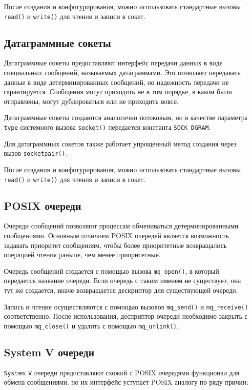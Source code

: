 \documentclass[14pt, russian]{scrartcl}
\begin{document}
После создания и конфигурирования, можно использовать стандартные вызовы
\verb|read()| и \verb|write()| для чтения и записи в сокет.

\subsection{Датаграммные сокеты}

Датаграммные сокеты предоставляют интерфейс передачи данных в виде специальных
сообщений, называемых датаграммами. Это позволяет передавать данные в виде
детерминированных сообщений, но надежность передачи не гарантируется. Сообщения
могут приходить не в том порядке, в каком были отправлены, могут дублироваться
или не приходить вовсе.

Датаграммные сокеты создаются аналогично потоковым, но в качестве параметра
\verb|type| системного вызова \verb|socket()| передается константа
\verb|SOCK_DGRAM|.

Для датаграммных сокетов также работает упрощенный метод создания через вызов
\verb|socketpair()|.

После создания и конфигурирования, можно использовать стандартные вызовы
\verb|read()| и \verb|write()| для чтения и записи в сокет.

\subsection{POSIX очереди}

Очереди сообщений позволяют процессам обмениваться детерминированными
сообщениями. Основным отличием POSIX очередей является возможность задавать
приоритет сообщениям, чтобы более приоритетные возвращались операцией чтения
раньше, чем менее приоритетные.

Очередь сообщений создается с помощью вызова \verb|mq_open()|, в который
передается название очереди. Если очередь с таким именем не существует, она тут
же создается, иначе возвращается дескриптор для существующей очереди.

Запись и чтение осуществляются с помощью вызовов \verb|mq_send()| и
\verb|mq_receive()| соответственно. После использования, десприптор очереди
необходимо закрыть с помощью \verb|mq_close()| и удалить с помощью
\verb|mq_unlink()|.

\subsection{System V очереди}

\verb|System V| очереди предоставляют схожий с POSIX очередями функционал для
обмена сообщениями, но их интерфейс уступает POSIX аналогу по ряду причин:
\end{document}
